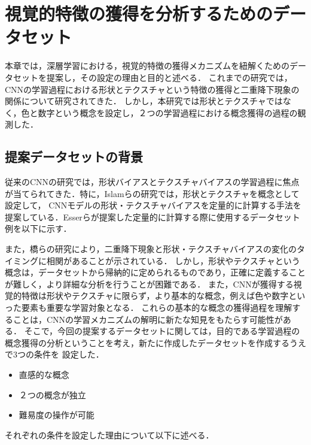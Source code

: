 \chapter{視覚的特徴の獲得を分析するためのデータセット}
\label{chap:experiment_settings}
本章では，深層学習における，視覚的特徴の獲得メカニズムを紐解くためのデータセットを提案し，その設定の理由と目的と述べる．
これまでの研究では，CNNの学習過程における形状とテクスチャという特徴の獲得と二重降下現象の関係について研究されてきた．
しかし，本研究では形状とテクスチャではなく，色と数字という概念を設定し，２つの学習過程における概念獲得の過程の観測した．

\section{提案データセットの背景}
従来のCNNの研究では，形状バイアスとテクスチャバイアスの学習過程に焦点が当てられてきた．特に，Islamらの研究では，形状とテクスチャを概念として設定して，
CNNモデルの形状・テクスチャバイアスを定量的に計算する手法を提案している．Esserらが提案した定量的に計算する際に使用するデータセット例を以下に示す．



また，橋らの研究により，二重降下現象と形状・テクスチャバイアスの変化のタイミングに相関があることが示されている．
しかし，形状やテクスチャという概念は，データセットから帰納的に定められるものであり，正確に定義することが難しく，より詳細な分析を行うことが困難である．
また，CNNが獲得する視覚的特徴は形状やテクスチャに限らず，より基本的な概念，例えば色や数字といった要素も重要な学習対象となる．
これらの基本的な概念の獲得過程を理解することは，CNNの学習メカニズムの解明に新たな知見をもたらす可能性がある．
そこで，今回の提案するデータセットに関しては，目的である学習過程の概念獲得の分析ということを考え，新たに作成したデータセットを作成するうえで3つの条件を
設定した．

\begin{itemize}
    \item 直感的な概念
    \item ２つの概念が独立
    \item 難易度の操作が可能
\end{itemize}

それぞれの条件を設定した理由について以下に述べる．

